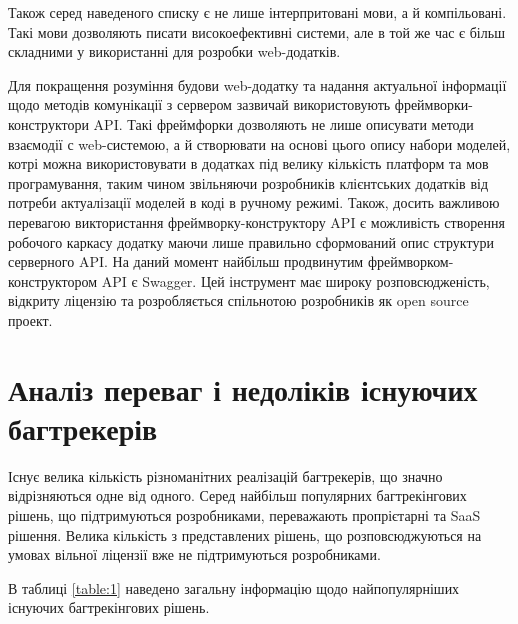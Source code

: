 \documentclass[../main.tex]{subfiles}
\begin{document}
Також серед наведеного списку є не лише інтерпритовані мови, а й компільовані. Такі мови дозволяють писати високоефективні системи, але в той же час є більш складними у використанні для розробки web-додатків.

Для покращення розуміння будови web-додатку та надання актуальної інформації щодо методів комунікації з сервером зазвичай використовують фреймворки-конструктори API. Такі фреймфорки дозволяють не лише описувати методи взаємодії с web-системою, а й створювати на основі цього опису набори моделей, котрі можна використовувати в додатках під велику кількість платформ та мов програмування, таким чином звільняючи розробників клієнтських додатків від потреби актуалізації моделей в коді в ручному режимі. Також, досить важливою перевагою виктористання фреймворку-конструктору API є можливість створення робочого каркасу додатку маючи лише правильно сформований опис структури серверного API. На даний момент найбільш продвинутим фреймворком-конструктором API є Swagger. Цей інструмент має широку розповсюдженість, відкриту ліцензію та розробляється спільнотою розробників як open source проект.

\section{Аналіз переваг і недоліків існуючих багтрекерів}

Існує велика кількість різноманітних реалізацій багтрекерів, що значно відрізняються одне від одного. Серед найбільш популярних багтрекінгових рішень, що підтримуються розробниками, переважають пропрієтарні та SaaS рішення. Велика кількість з представлених рішень, що розповсюджуються на умовах вільної ліцензії вже не підтримуються розробниками.

В таблиці \ref{table:1} наведено загальну інформацію щодо найпопулярніших існуючих багтрекінгових рішень.
\end{document}
